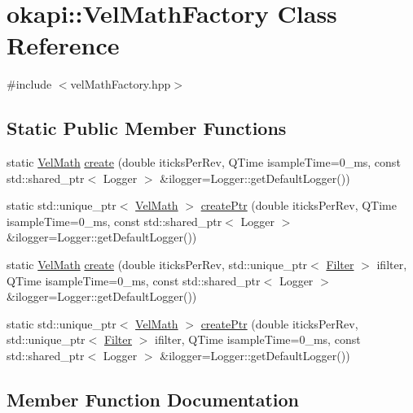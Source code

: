 \hypertarget{classokapi_1_1VelMathFactory}{}\section{okapi\+::Vel\+Math\+Factory Class Reference}
\label{classokapi_1_1VelMathFactory}


{\ttfamily \#include $<$vel\+Math\+Factory.\+hpp$>$}

\subsection*{Static Public Member Functions}
\begin{DoxyCompactItemize}
\item 
static \mbox{\hyperlink{classokapi_1_1VelMath}{Vel\+Math}} \mbox{\hyperlink{classokapi_1_1VelMathFactory_a67a3815e387baa98b4eb55d8d29472e0}{create}} (double iticks\+Per\+Rev, Q\+Time isample\+Time=0\+\_\+ms, const std\+::shared\+\_\+ptr$<$ Logger $>$ \&ilogger=\+Logger\+::get\+Default\+Logger())
\item 
static std\+::unique\+\_\+ptr$<$ \mbox{\hyperlink{classokapi_1_1VelMath}{Vel\+Math}} $>$ \mbox{\hyperlink{classokapi_1_1VelMathFactory_a26b75e227e114812131c64d17015948f}{create\+Ptr}} (double iticks\+Per\+Rev, Q\+Time isample\+Time=0\+\_\+ms, const std\+::shared\+\_\+ptr$<$ Logger $>$ \&ilogger=\+Logger\+::get\+Default\+Logger())
\item 
static \mbox{\hyperlink{classokapi_1_1VelMath}{Vel\+Math}} \mbox{\hyperlink{classokapi_1_1VelMathFactory_a7a312909314e4016d82a173ebcbc2bdc}{create}} (double iticks\+Per\+Rev, std\+::unique\+\_\+ptr$<$ \mbox{\hyperlink{classokapi_1_1Filter}{Filter}} $>$ ifilter, Q\+Time isample\+Time=0\+\_\+ms, const std\+::shared\+\_\+ptr$<$ Logger $>$ \&ilogger=\+Logger\+::get\+Default\+Logger())
\item 
static std\+::unique\+\_\+ptr$<$ \mbox{\hyperlink{classokapi_1_1VelMath}{Vel\+Math}} $>$ \mbox{\hyperlink{classokapi_1_1VelMathFactory_aeccef757e8dc90b569c1174c903bd4f9}{create\+Ptr}} (double iticks\+Per\+Rev, std\+::unique\+\_\+ptr$<$ \mbox{\hyperlink{classokapi_1_1Filter}{Filter}} $>$ ifilter, Q\+Time isample\+Time=0\+\_\+ms, const std\+::shared\+\_\+ptr$<$ Logger $>$ \&ilogger=\+Logger\+::get\+Default\+Logger())
\end{DoxyCompactItemize}


\subsection{Member Function Documentation}
\mbox{\label{classokapi_1_1VelMathFactory_a67a3815e387baa98b4eb55d8d29472e0}} 
